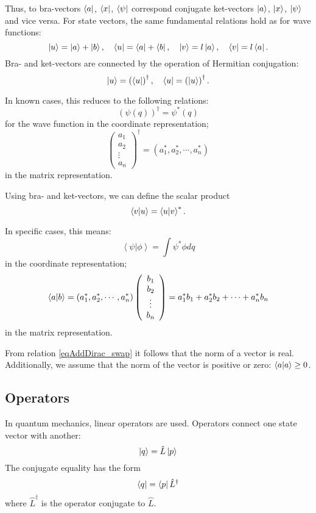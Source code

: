 Thus, to bra-vectors
$\bra{ a }$,  $\bra{ x }$, $\bra{ \psi }$
correspond conjugate ket-vectors  
$\ket{ a }$,  $\ket{ x }$, $\ket{ \psi }$
and vice versa. For state vectors, the same fundamental relations hold as for wave functions:  
\begin{equation}
\ket{ u } = \ket{ a }  + \ket{ b }, \quad 
\bra{ u } = \bra{ a }  + \bra{ b }, \quad 
\ket{ v } = l \ket{ a }, \quad  
\bra{ v } = l \bra{ a }.
\end{equation}
Bra- and ket-vectors are connected by the operation of Hermitian conjugation:
\begin{equation}
\ket{ u } = \left( \bra{ u } \right)^{\dag}, \quad 
\bra{ u } = \left( \ket{ u } \right)^{\dag}.
\end{equation}

In known cases, this reduces to the following relations:
\[
\left( \psi\left( q \right) \right)^{\dag} = \psi^{*}\left( q \right)
\]
for the wave function in the coordinate representation;
\[
\left(
\begin{array} {c} 
a_1 \\
a_2 \\
\vdots \\
a_n
\end{array}
 \right)^{\dag} = 
\left( a_1^{*}, a_2^{*}, \cdots, a_n^{*}\right)
\]
in the matrix representation.

Using bra- and ket-vectors, we can define the scalar product
\begin{equation}
\bra{ v }\ket{ u } = \bra{ u }\ket{ v }^{*}.
\label{eqAddDirac_swap}
\end{equation}

In specific cases, this means:
\[
\left< \psi \right|\left. \phi \right> = 
\int \psi^{*} \phi dq
\]
in the coordinate representation;
\[
\bra{ a }\ket{ b } = 
\left( a_1^{*}, a_2^{*}, \cdots, a_n^{*}\right) 
\left(
\begin{array} {c} 
b_1 \\
b_2 \\
\vdots \\
b_n
\end{array}
 \right) = 
a_1^{*} b_1 +  a_2^{*} b_2 + \cdots + a_n^{*} b_n
\]
in the matrix representation.

From relation \eqref{eqAddDirac_swap} it follows that the norm of a vector is real. Additionally, we assume that the norm of the vector is positive or zero: 
$\bra{ a }\ket{ a } \geq 0$.

\subsection{Operators}
In quantum mechanics, linear operators are used. Operators connect one state vector with another: 
\begin{equation}
\ket{ q } = \hat{L}\ket{ p }
\label{eqAddDirac_operator_property1}
\end{equation}
The conjugate equality has the form
\begin{equation}
\bra{ q } = \bra{ p }  \hat{L}^{\dag}
\label{eqAddDirac_operator_property2}
\end{equation}
where $\hat{L}^{\dag}$ is the operator conjugate to $\hat{L}$.

